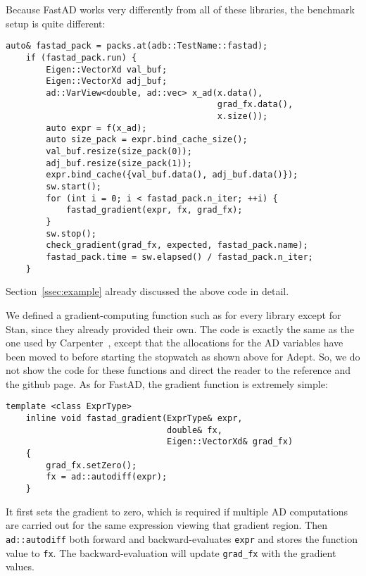 Because FastAD works very differently from all of these libraries,
the benchmark setup is quite different:
\begin{lstlisting}[style=customcpp]
    auto& fastad_pack = packs.at(adb::TestName::fastad);
    if (fastad_pack.run) {
        Eigen::VectorXd val_buf;
        Eigen::VectorXd adj_buf;
        ad::VarView<double, ad::vec> x_ad(x.data(),
                                          grad_fx.data(),
                                          x.size());
        auto expr = f(x_ad);
        auto size_pack = expr.bind_cache_size();
        val_buf.resize(size_pack(0));
        adj_buf.resize(size_pack(1));
        expr.bind_cache({val_buf.data(), adj_buf.data()});
        sw.start();
        for (int i = 0; i < fastad_pack.n_iter; ++i) {
            fastad_gradient(expr, fx, grad_fx);
        }
        sw.stop();
        check_gradient(grad_fx, expected, fastad_pack.name);
        fastad_pack.time = sw.elapsed() / fastad_pack.n_iter;
    }
\end{lstlisting}
Section~\ref{ssec:example} already discussed the above code in detail.

We defined a gradient-computing function such as  for every library except for Stan,
since they already provided their own.
The code is exactly the same as the one used by Carpenter~\cite{carpenter:2015},
except that the allocations for the AD variables have been moved to before starting the stopwatch as shown above for Adept.
So, we do not show the code for these functions and 
direct the reader to the reference and the github page.
As for FastAD, the gradient function is extremely simple:
\begin{lstlisting}[style=customcpp]
    template <class ExprType>
    inline void fastad_gradient(ExprType& expr,
                                double& fx,
                                Eigen::VectorXd& grad_fx) 
    {
        grad_fx.setZero();
        fx = ad::autodiff(expr);
    }
\end{lstlisting}
It first sets the gradient to zero, which is required if multiple AD computations 
are carried out for the same expression viewing that gradient region.
Then \verb|ad::autodiff| both forward and backward-evaluates \verb|expr|
and stores the function value to \verb|fx|.
The backward-evaluation will update \verb|grad_fx| with the gradient values.


